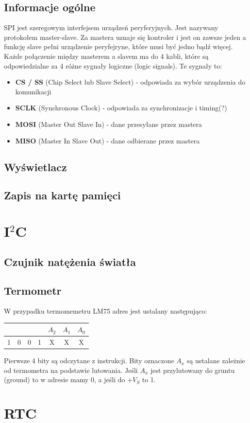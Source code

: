 \documentclass[11pt]{article}
\begin{document}
\subsection{Informacje ogólne}
SPI jest szeregowym interfejsem urządzeń peryferyjnych. Jest nazywany
protokołem master-slave. Za mastera uznaje się kontroler i jest on zawsze
jeden a funkcję slave pełni urządzenie peryfejryne, które musi być jedno bądź więcej.
Każde połączenie między masterem a slavem ma do 4 kabli, które są odpowiedzialne
za 4 różne sygnały logiczne (logic signals). Te sygnały to:
\begin{itemize}
    \item {
        \textbf{CS / SS} (Chip Select lub Slave Select) - odpowiada za wybór 
        urządzenia do komunikacji
    }
    \item {
        \textbf{SCLK} (Synchronous Clock) - odpowiada za synchronizacje i timing(?)
    }
    \item {
        \textbf{MOSI} (Master Out Slave In) - dane przesyłane
        przez mastera
    }
    \item {
        \textbf{MISO} (Master In Slave Out) - dane odbierane przez
        mastera
    }
\end{itemize}


\subsection{Wyświetlacz}
\subsection{Zapis na kartę pamięci}

\section{I$^2$C}
\subsection{Czujnik natężenia światła}
\subsection{Termometr}
W przypadku termomemetru LM75 adres jest ustalany następująco:
\begin{center}
    \begin{tabular}{|c|c|c|c|c|c|c|}
        \hline
         & & & & $A_2$ & $A_1$ & $A_0$\\
        \hline
        1& 0& 0& 1& X & X & X\\
        \hline
    \end{tabular}
\end{center}
Pierwsze 4 bity są odczytane z instrukcji. Bity oznaczone $A_x$ są ustalane
zależnie od termometra na podstawie lutowania. Jeśli $A_x$ jest przylutowany
do gruntu (ground) to w adresie mamy 0, a jeśli do $+V_S$ to 1.
\section{RTC}
\end{document}
